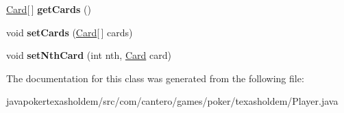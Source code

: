 \begin{DoxyCompactItemize}
\item 
\hypertarget{classcom_1_1cantero_1_1games_1_1poker_1_1texasholdem_1_1_player_aed91ac41e13aed0b114e3668aa34f8d7}{}\hyperlink{classcom_1_1cantero_1_1games_1_1poker_1_1texasholdem_1_1_card}{Card}\mbox{[}$\,$\mbox{]} {\bfseries get\+Cards} ()\label{classcom_1_1cantero_1_1games_1_1poker_1_1texasholdem_1_1_player_aed91ac41e13aed0b114e3668aa34f8d7}

\item 
\hypertarget{classcom_1_1cantero_1_1games_1_1poker_1_1texasholdem_1_1_player_ada2f4e3f1a85119894ab910f291ed89a}{}void {\bfseries set\+Cards} (\hyperlink{classcom_1_1cantero_1_1games_1_1poker_1_1texasholdem_1_1_card}{Card}\mbox{[}$\,$\mbox{]} cards)\label{classcom_1_1cantero_1_1games_1_1poker_1_1texasholdem_1_1_player_ada2f4e3f1a85119894ab910f291ed89a}

\item 
\hypertarget{classcom_1_1cantero_1_1games_1_1poker_1_1texasholdem_1_1_player_a0e3bcf6e60d87aaba6cc32bfa4d0e1e6}{}void {\bfseries set\+Nth\+Card} (int nth, \hyperlink{classcom_1_1cantero_1_1games_1_1poker_1_1texasholdem_1_1_card}{Card} card)\label{classcom_1_1cantero_1_1games_1_1poker_1_1texasholdem_1_1_player_a0e3bcf6e60d87aaba6cc32bfa4d0e1e6}

\end{DoxyCompactItemize}


The documentation for this class was generated from the following file\+:\begin{DoxyCompactItemize}
\item 
javapokertexasholdem/src/com/cantero/games/poker/texasholdem/Player.\+java\end{DoxyCompactItemize}
